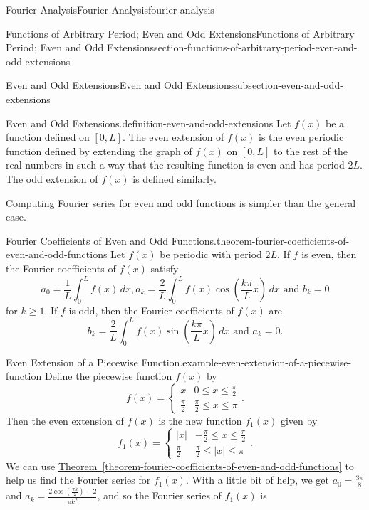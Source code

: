 \documentclass[oneside,10pt,]{book}
\numberwithin{equation}{section}
\newcommand{\amp}{&}
\begin{document}
\begin{chapterptx}{Fourier Analysis}{}{Fourier Analysis}{}{}{fourier-analysis}
\begin{sectionptx}{Functions of Arbitrary Period; Even and Odd Extensions}{}{Functions of Arbitrary Period; Even and Odd Extensions}{}{}{section-functions-of-arbitrary-period-even-and-odd-extensions}
\begin{subsectionptx}{Even and Odd Extensions}{}{Even and Odd Extensions}{}{}{subsection-even-and-odd-extensions}
\begin{definition}{Even and Odd Extensions.}{definition-even-and-odd-extensions}
Let \(f(x)\) be a function defined on \([0,L]\). The even extension of \(f(x)\) is the even periodic function defined by extending the graph of \(f(x)\) on \([0,L]\) to the rest of the real numbers in such a way that the resulting function is even and has period \(2L\). The odd extension of \(f(x)\) is defined similarly.%
\end{definition}
\hypertarget{p-597}{}%
Computing Fourier series for even and odd functions is simpler than the general case.%
\begin{theorem}{Fourier Coefficients of Even and Odd Functions.}{}{theorem-fourier-coefficients-of-even-and-odd-functions}%
\hypertarget{p-598}{}%
Let \(f(x)\) be periodic with period \(2L\). If \(f\) is even, then the Fourier coefficients of \(f(x)\) satisfy%
\begin{equation*}
a_{0} = \frac{1}{L}\int_{0}^{L}f(x)\,dx, a_{k} = \frac{2}{L}\int_{0}^{L}f(x)\cos\left(\frac{k\pi}{L}x\right)\,dx\text{ and } b_{k} = 0
\end{equation*}
for \(k\geq1\). If \(f\) is odd, then the Fourier coefficients of \(f(x)\) are%
\begin{equation*}
b_{k} = \frac{2}{L}\int_{0}^{L}f(x)\sin\left(\frac{k\pi}{L}x\right)\,dx\text{ and } a_{k} = 0.
\end{equation*}
%
\end{theorem}
\begin{example}{Even Extension of a Piecewise Function.}{example-even-extension-of-a-piecewise-function}%
\hypertarget{p-599}{}%
Define the piecewise function \(f(x)\) by%
\begin{equation*}
f(x) = \begin{cases}x \amp 0\leq x\leq \frac{\pi}{2} \\ \frac{\pi}{2} \amp \frac{\pi}{2}\leq x\leq \pi\end{cases}.
\end{equation*}
Then the even extension of \(f(x)\) is the new function \(f_{1}(x)\) given by%
\begin{equation*}
f_{1}(x) = \begin{cases}|x| \amp -\frac{\pi}{2}\leq x\leq \frac{\pi}{2} \\ \frac{\pi}{2} \amp \frac{\pi}{2}\leq |x|\leq \pi\end{cases}.
\end{equation*}
We can use \hyperref[theorem-fourier-coefficients-of-even-and-odd-functions]{Theorem~\ref{theorem-fourier-coefficients-of-even-and-odd-functions}} to help us find the Fourier series for \(f_{1}(x)\). With a little bit of help, we get \(a_{0} = \frac{3\pi}{8}\) and \(a_{k} = \frac{2\cos(\frac{\pi k}{2})-2}{\pi k^{2}}\), and so the Fourier series of \(f_{1}(x)\) is%

\end{example}
\end{subsectionptx}
\end{sectionptx}
\end{chapterptx}
\end{document}
